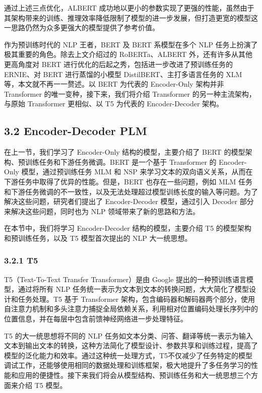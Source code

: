 \documentclass[
]{article}
\begin{document}
通过上述三点优化，ALBERT
成功地以更小的参数实现了更强的性能，虽然由于其架构带来的训练、推理效率降低限制了模型的进一步发展，但打造更宽的模型这一思路仍然为众多更强大的模型提供了参考价值。

作为预训练时代的 NLP 王者，BERT 及 BERT 系模型在多个 NLP
任务上扮演了极其重要的角色。除去上文介绍过的 RoBERTa、ALBERT
外，还有许多从其他更高角度对 BERT
进行优化的后起之秀，包括进一步改进了预训练任务的 ERNIE、对 BERT
进行蒸馏的小模型 DistilBERT、主打多语言任务的 XLM
等，本文就不再一一赘述。以 BERT 为代表的 Encoder-Only 架构并非
Transformer 的唯一变种，接下来，我们将介绍 Transformer
的另一种主流架构，与原始 Transformer 更相似、以 T5 为代表的
Encoder-Decoder 架构。

\subsection{3.2 Encoder-Decoder PLM}\label{encoder-decoder-plm}

在上一节，我们学习了 Encoder-Only 结构的模型，主要介绍了 BERT
的模型架构、预训练任务和下游任务微调。BERT 是一个基于 Transformer 的
Encoder-Only 模型，通过预训练任务 MLM 和 NSP
来学习文本的双向语义关系，从而在下游任务中取得了优异的性能。但是，BERT
也存在一些问题，例如 MLM
任务和下游任务微调的不一致性，以及无法处理超过模型训练长度的输入等问题。为了解决这些问题，研究者们提出了
Encoder-Decoder 模型，通过引入 Decoder 部分来解决这些问题，同时也为 NLP
领域带来了新的思路和方法。

在本节中，我们将学习 Encoder-Decoder 结构的模型，主要介绍 T5
的模型架构和预训练任务，以及 T5 模型首次提出的 NLP 大一统思想。

\subsubsection{3.2.1 T5}\label{t5}

T5（Text-To-Text Transfer Transformer）是由 Google
提出的一种预训练语言模型，通过将所有 NLP
任务统一表示为文本到文本的转换问题，大大简化了模型设计和任务处理。T5
基于 Transformer
架构，包含编码器和解码器两个部分，使用自注意力机制和多头注意力捕捉全局依赖关系，利用相对位置编码处理长序列中的位置信息，并在每层中包含前馈神经网络进一步处理特征。

T5 的大一统思想将不同的 NLP
任务如文本分类、问答、翻译等统一表示为输入文本到输出文本的转换，这种方法简化了模型设计、参数共享和训练过程，提高了模型的泛化能力和效率。通过这种统一处理方式，T5不仅减少了任务特定的模型调试工作，还能够使用相同的数据处理和训练框架，极大地提升了多任务学习的性能和应用的便捷性。接下来我们将会从模型结构、预训练任务和大一统思想三个方面来介绍
T5 模型。
\end{document}
